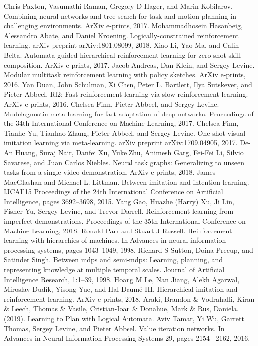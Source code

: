 \documentclass[letterpaper, 10 pt, conference]{ieeeconf}  %
\begin{document}
\begin{thebibliography}{99}


 Chris Paxton, Vasumathi Raman, Gregory D Hager, and Marin Kobilarov. Combining neural networks and tree search for task and motion planning in challenging environments. ArXiv e-prints, 2017.
 Mohammadhosein Hasanbeig, Alessandro Abate, and Daniel Kroening. Logically-constrained reinforcement learning. arXiv preprint arXiv:1801.08099, 2018.
 Xiao Li, Yao Ma, and Calin Belta. Automata guided hierarchical reinforcement learning for zero-shot skill composition. ArXiv e-prints, 2017.
 Jacob Andreas, Dan Klein, and Sergey Levine. Modular multitask reinforcement learning with policy sketches. ArXiv e-prints, 2016.
 Yan Duan, John Schulman, Xi Chen, Peter L. Bartlett, Ilya Sutskever, and Pieter Abbeel. Rl2: Fast reinforcement learning via slow reinforcement learning. ArXiv e-prints, 2016.
 Chelsea Finn, Pieter Abbeel, and Sergey Levine. Modelagnostic meta-learning for fast adaptation of deep networks. Proceedings of the 34th International Conference on Machine Learning, 2017.
 Chelsea Finn, Tianhe Yu, Tianhao Zhang, Pieter Abbeel, and Sergey Levine. One-shot visual imitation learning via meta-learning. arXiv preprint arXiv:1709.04905, 2017.
 De-An Huang, Suraj Nair, Danfei Xu, Yuke Zhu, Animesh Garg, Fei-Fei Li, Silvio Savarese, and Juan Carlos Niebles. Neural task graphs: Generalizing to unseen tasks from a single video demonstration. ArXiv e-prints, 2018.
 James MacGlashan and Michael L. Littman. Between imitation and intention learning. IJCAI’15 Proceedings of the 24th International Conference on Artificial Intelligence, pages 3692–3698, 2015.
 Yang Gao, Huazhe (Harry) Xu, Ji Lin, Fisher Yu, Sergey Levine, and Trevor Darrell. Reinforcement learning from imperfect demonstrations. Proceedings of the 35th International Conference on Machine Learning, 2018.
 Ronald Parr and Stuart J Russell. Reinforcement learning with hierarchies of machines. In Advances in neural information processing systems, pages 1043–1049, 1998.
 Richard S Sutton, Doina Precup, and Satinder Singh. Between mdps and semi-mdps: Learning, planning, and representing knowledge at multiple temporal scales. Journal of Artificial Intelligence Research, 1:1–39, 1998.
 Hoang M Le, Nan Jiang, Alekh Agarwal, Miroslav Dudík, Yisong Yue, and Hal Daumé III. Hierarchical imitation and reinforcement learning. ArXiv e-prints, 2018.
 Araki, Brandon \& Vodrahalli, Kiran \& Leech, Thomas \& Vasile, Cristian-Ioan \& Donahue, Mark \& Rus, Daniela. (2019). Learning to Plan with Logical Automata.
 Aviv Tamar, Yi Wu, Garrett Thomas, Sergey Levine, and Pieter Abbeel. Value iteration networks. In Advances in Neural Information Processing Systems 29, pages 2154– 2162, 2016.


\end{thebibliography}
\end{document}
